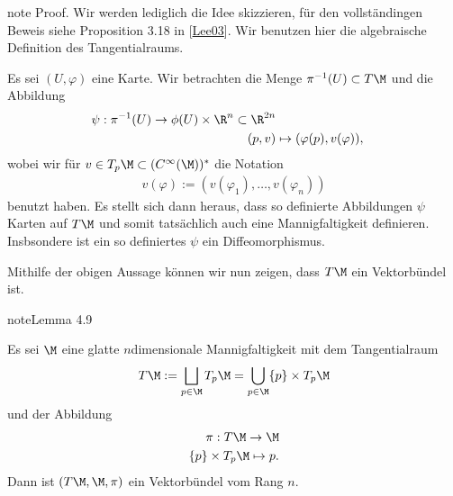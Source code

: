 \documentclass[letterpaper,10pt,german]{jupyterBook}
\begin{document}
\begin{sphinxadmonition}{note}
\sphinxAtStartPar
Proof. Wir werden lediglich die Idee skizzieren, für den vollständingen Beweis siehe Proposition 3.18 in {[}\hyperlink{cite.references:id18}{Lee03}{]}.
Wir benutzen hier die algebraische Definition des Tangentialraums.

\sphinxAtStartPar
Es sei \((U,\varphi)\) eine Karte.
Wir betrachten die Menge \(\pi^{-1}(U)\subset T\M\) und die Abbildung
\begin{equation*}
\begin{split}\psi:\pi^{-1}(U) \to \phi(U)\times \R^{n}\subset\R^{2n}\\
(p,v) &\mapsto (\varphi(p), v(\varphi)),\end{split}
\end{equation*}
\sphinxAtStartPar
wobei wir für \(v\in T_p\M\subset (C^\infty(\M))^\ast\) die Notation
\begin{equation*}
\begin{split}v(\varphi) := (v(\varphi_1),\ldots, v(\varphi_n))\end{split}
\end{equation*}
\sphinxAtStartPar
benutzt haben.
Es stellt sich dann heraus, dass so definierte Abbildungen \(\psi\) Karten auf \(T\M\) und somit tatsächlich auch eine Mannigfaltigkeit definieren.
Insbsondere ist ein so definiertes \(\psi\) ein Diffeomorphismus.
\end{sphinxadmonition}

\sphinxAtStartPar
Mithilfe der obigen Aussage können wir nun zeigen, dass \(T\M\) ein Vektorbündel ist.
\label{manifolds/tangential:lem:tanbundle}
\begin{sphinxadmonition}{note}{Lemma 4.9}



\sphinxAtStartPar
Es sei \(\M\) eine glatte \(n\)\sphinxhyphen{}dimensionale Mannigfaltigkeit mit dem Tangentialraum
\begin{equation*}
\begin{split}T\M:= \bigsqcup_{p\in\M}  T_p\M = \bigcup_{p\in\M} \{p\} \times T_p\M\end{split}
\end{equation*}
\sphinxAtStartPar
und der Abbildung
\begin{equation*}
\begin{split}\pi:T\M\to \M\\
\{p\}\times T_p\M\mapsto p.\end{split}
\end{equation*}
\sphinxAtStartPar
Dann ist \((T\M, \M, \pi)\) ein Vektorbündel vom Rang \(n\).
\end{sphinxadmonition}
\end{document}
